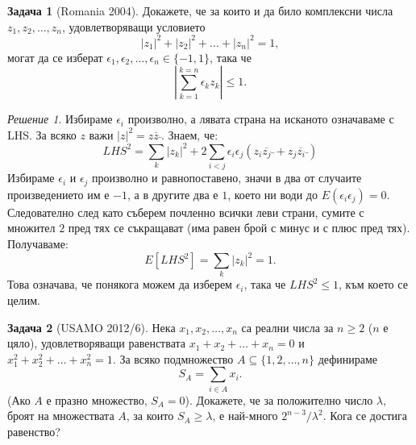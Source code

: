 \documentclass[11 pt, a4paper]{article}
\theoremstyle{definition}
\newtheorem{p}{Задача}
\theoremstyle{remark}
\newtheorem*{s}{Решение}
\begin{document}
\begin{p}[Romania 2004]

Докажете, че за които и да било комплексни числа $z_1, z_2,\dots,z_n$, удовлетворяващи условието
\begin{equation*}
|z_1|^2+|z_2|^2+\dots+|z_n|^2=1,\end{equation*} могат да се изберат $\epsilon_1,\epsilon_2,\dots,\epsilon_n\in \{-1,1\}$, така че\\
\begin{equation*}
\left|\sum_{k=1}^{k=n} \epsilon_k z_k\right|\leq1.
\end{equation*}\par
\end{p}
\begin{s}
Избираме $\epsilon_i$ произволно, а лявата страна на исканото означаваме с LHS. За всяко $z$ важи $|z|^2=z\overline{z}\bar{}$. Знаем, че:
\begin{equation*}
LHS^2=\sum_{k}\left|z_k\right|^2+2\sum_{i<j}\epsilon_i\epsilon_j(z_i\overline{z_j}\bar{}+z_j\overline{z_i}\bar{})
\end{equation*}
Избираме $\epsilon_i$ и $\epsilon_j$ произволно и равнопоставено, значи в два от случаите произведението им е $-1$, а в другите два е $1$, което ни води до $E(\epsilon_i \epsilon_j)=0$. Следователно след като съберем почленно всички леви страни, сумите с множител $2$ пред тях се съкращават (има равен брой с минус и с плюс пред тях). Получаваме:  
\begin{equation*}
E[LHS^2]=\sum_k\left|z_k\right|^2=1.
\end{equation*}
Това означава, че понякога можем да изберем $\epsilon_i$, така че $LHS^2\leq1$, към което се целим.
\end{s}
\begin{p}[USAMO 2012/6]

Нека $x_1,x_2,\dots,x_n$ са реални числа за $n\geq2$ ($n$ е цяло), удовлетворяващи равенствата $x_1+x_2+\dots+x_n=0$ и $x_1^2+x_2^2+\dots+x_n^2=1$. За всяко подмножество $A\subseteq\{1,2,\dots,n\}$ дефинираме
\begin{equation*}
S_A=\sum_{i\in A} x_i.
\end{equation*}
(Ако $A$ е празно множество, $S_A=0$). Докажете, че за положително число $\lambda$, броят на множествата $A$, за които $S_A\geq\lambda $, е най-много $2^{n-3}/\lambda^2$. Кога се достига равенство?\par
\end{p}
\end{document}

